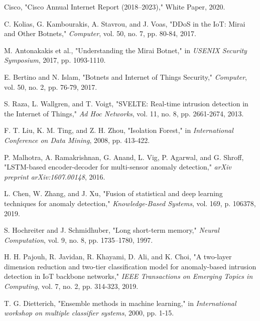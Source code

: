 \documentclass[conference]{IEEEtran}
\begin{document}
\begin{thebibliography}{00}

 Cisco, "Cisco Annual Internet Report (2018–2023)," White Paper, 2020.

 C. Kolias, G. Kambourakis, A. Stavrou, and J. Voas, "DDoS in the IoT: Mirai and Other Botnets," \textit{Computer}, vol. 50, no. 7, pp. 80-84, 2017.

 M. Antonakakis et al., "Understanding the Mirai Botnet," in \textit{USENIX Security Symposium}, 2017, pp. 1093-1110.

 E. Bertino and N. Islam, "Botnets and Internet of Things Security," \textit{Computer}, vol. 50, no. 2, pp. 76-79, 2017.

 S. Raza, L. Wallgren, and T. Voigt, "SVELTE: Real-time intrusion detection in the Internet of Things," \textit{Ad Hoc Networks}, vol. 11, no. 8, pp. 2661-2674, 2013.

 F. T. Liu, K. M. Ting, and Z. H. Zhou, "Isolation Forest," in \textit{International Conference on Data Mining}, 2008, pp. 413-422.

 P. Malhotra, A. Ramakrishnan, G. Anand, L. Vig, P. Agarwal, and G. Shroff, "LSTM-based encoder-decoder for multi-sensor anomaly detection," \textit{arXiv preprint arXiv:1607.00148}, 2016.

 L. Chen, W. Zhang, and J. Xu, "Fusion of statistical and deep learning techniques for anomaly detection," \textit{Knowledge-Based Systems}, vol. 169, p. 106378, 2019.

 S. Hochreiter and J. Schmidhuber, "Long short-term memory," \textit{Neural Computation}, vol. 9, no. 8, pp. 1735–1780, 1997.

 H. H. Pajouh, R. Javidan, R. Khayami, D. Ali, and K. Choi, "A two-layer dimension reduction and two-tier classification model for anomaly-based intrusion detection in IoT backbone networks," \textit{IEEE Transactions on Emerging Topics in Computing}, vol. 7, no. 2, pp. 314-323, 2019.

 T. G. Dietterich, "Ensemble methods in machine learning," in \textit{International workshop on multiple classifier systems}, 2000, pp. 1-15.


\end{thebibliography}
\end{document}

